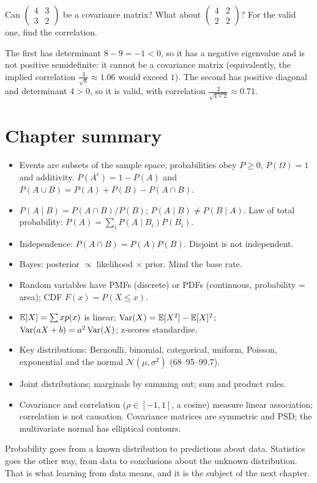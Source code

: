 \begin{exercise}
Can $\left(\begin{smallmatrix} 4 & 3\\ 3 & 2\end{smallmatrix}\right)$ be a
covariance matrix? What about $\left(\begin{smallmatrix} 4 & 2\\ 2 &
2\end{smallmatrix}\right)$? For the valid one, find the correlation.
\end{exercise}
\begin{solution}
The first has determinant $8 - 9 = -1 < 0$, so it has a negative eigenvalue and
is not positive semidefinite: it cannot be a covariance matrix (equivalently, the
implied correlation $\tfrac{3}{\sqrt8} \approx 1.06$ would exceed $1$). The second
has positive diagonal and determinant $4 > 0$, so it is valid, with correlation
$\tfrac{2}{\sqrt{4\times2}} \approx 0.71$.
\end{solution}

\section{Chapter summary}\label{sec:ch9-summary}

\begin{keytakeaways}
\begin{itemize}
  \item Events are subsets of the sample space; probabilities obey
    $P \ge 0$, $P(\Omega) = 1$ and additivity. $P(A^c) = 1 - P(A)$ and
    $P(A\cup B) = P(A) + P(B) - P(A\cap B)$.
  \item $P(A \mid B) = P(A \cap B)/P(B)$; $P(A \mid B) \neq P(B \mid A)$. Law of total
    probability: $P(A) = \sum_iP(A \mid B_i)P(B_i)$.
  \item Independence: $P(A \cap B) = P(A)P(B)$. Disjoint is not independent.
  \item Bayes: posterior $\propto$ likelihood $\times$ prior. Mind the base rate.
  \item Random variables have PMFs (discrete) or PDFs (continuous, probability =
    area); CDF $F(x) = P(X \le x)$.
  \item $\mathbb{E}[X] = \sum xp(x)$ is linear; $\operatorname{Var}(X) = \mathbb{E}[X^2] - \mathbb{E}[X]^2$;
    $\operatorname{Var}(aX + b) = a^2\operatorname{Var}(X)$; z-scores standardise.
  \item Key distributions: Bernoulli, binomial, categorical, uniform, Poisson,
    exponential and the normal $\mathcal{N}(\mu, \sigma^2)$ (68--95--99.7).
  \item Joint distributions; marginals by summing out; sum and product rules.
  \item Covariance and correlation ($\rho \in [-1, 1]$, a cosine) measure linear
    association; correlation is not causation. Covariance matrices are symmetric
    and PSD; the multivariate normal has elliptical contours.
\end{itemize}
\end{keytakeaways}

Probability goes from a known distribution to predictions about data. Statistics
goes the other way, from data to conclusions about the unknown distribution. That
is what learning from data means, and it is the subject of the next chapter.
